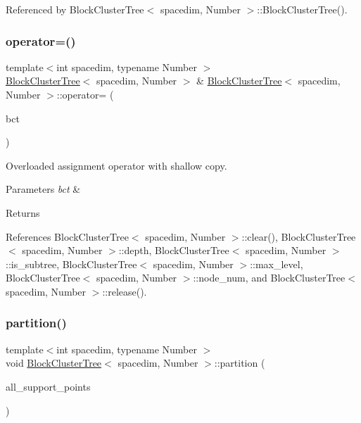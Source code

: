 Referenced by Block\+Cluster\+Tree$<$ spacedim, Number $>$\+::\+Block\+Cluster\+Tree().

\mbox{\label{classBlockClusterTree_aa635be81dfabed3ba455a17de3b65c2e}} 
\subsubsection{\texorpdfstring{operator=()}{operator=()}\hspace{0.1cm}{\footnotesize\ttfamily [2/2]}}
{\footnotesize\ttfamily template$<$int spacedim, typename Number $>$ \\
\hyperlink{classBlockClusterTree}{Block\+Cluster\+Tree}$<$ spacedim, Number $>$ \& \hyperlink{classBlockClusterTree}{Block\+Cluster\+Tree}$<$ spacedim, Number $>$\+::operator= (\begin{DoxyParamCaption}\item[{\hyperlink{classBlockClusterTree}{Block\+Cluster\+Tree}$<$ spacedim, Number $>$ \&\&}]{bct }\end{DoxyParamCaption})}

Overloaded assignment operator with shallow copy. 
\begin{DoxyParams}{Parameters}
{\em bct} & \\
\hline
\end{DoxyParams}
\begin{DoxyReturn}{Returns}

\end{DoxyReturn}


References Block\+Cluster\+Tree$<$ spacedim, Number $>$\+::clear(), Block\+Cluster\+Tree$<$ spacedim, Number $>$\+::depth, Block\+Cluster\+Tree$<$ spacedim, Number $>$\+::is\+\_\+subtree, Block\+Cluster\+Tree$<$ spacedim, Number $>$\+::max\+\_\+level, Block\+Cluster\+Tree$<$ spacedim, Number $>$\+::node\+\_\+num, and Block\+Cluster\+Tree$<$ spacedim, Number $>$\+::release().

\mbox{\label{classBlockClusterTree_a3ca42421f732c20fc07bdf5d5ab94319}} 
\subsubsection{\texorpdfstring{partition()}{partition()}\hspace{0.1cm}{\footnotesize\ttfamily [1/2]}}
{\footnotesize\ttfamily template$<$int spacedim, typename Number $>$ \\
void \hyperlink{classBlockClusterTree}{Block\+Cluster\+Tree}$<$ spacedim, Number $>$\+::partition (\begin{DoxyParamCaption}\item[{const std\+::vector$<$ Point$<$ spacedim $>$$>$ \&}]{all\+\_\+support\+\_\+points }\end{DoxyParamCaption})}

